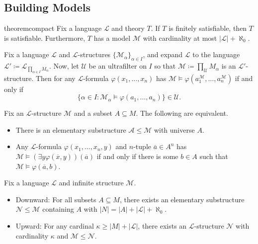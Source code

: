 \documentclass{article}
\begin{document}
\subsection{Building Models}
\begin{restatable}[compactness]{theorem}{compact} \label{thm:compactness}
	Fix a language $\mathcal L$ and theory $T$. If $T$ is finitely satisfiable, then $T$ is satisfiable. Furthermore, $T$ has a model $\mathcal M$ with cardinality at most $\left|\mathcal L\right|+\aleph_0$.
\end{restatable}
\begin{theorem}[\L{}o\'s] \label{thm:los}
	Fix a language $\mathcal L$ and $\mathcal L$-structures $\{\mathcal M_\alpha\}_{\alpha\in I}$, and expand $\mathcal L$ to the language $\mathcal L'\coloneqq\mathcal L_{\prod_{\alpha\in I}M_\alpha}$. Now, let $\mathcal U$ be an ultrafilter on $I$ so that $\mathcal M\coloneqq\prod_\mathcal UM_\alpha$ is an $\mathcal L'$-structure. Then for any $\mathcal L$-formula $\varphi(x_1,\ldots,x_n)$ has $\mathcal M\models\varphi\left(a_1^\mathcal M,\ldots,a_n^\mathcal M\right)$ if and only if
	\[\{\alpha\in I:\mathcal M_\alpha\models\varphi(a_1,\ldots,a_n)\}\in\mathcal U.\]
\end{theorem}
\begin{lemma} \label{lem:tarski-vaught}
	Fix an $\mathcal L$-structure $\mathcal M$ and a subset $A\subseteq M$. The following are equivalent.
	\begin{itemize}
		\item There is an elementary substructure $\mathcal A\le\mathcal M$ with universe $A$.
		\item Any $\mathcal L$-formula $\varphi(x_1,\ldots,x_n,y)$ and $n$-tuple $\overline a\in A^n$ has $\mathcal M\models(\exists y\varphi(\overline x,y))(\overline a)$ if and only if there is some $b\in A$ such that $\mathcal M\models\varphi(\overline a,b)$.
	\end{itemize}
\end{lemma}
\begin{theorem} \label{thm:down-skolem}
	Fix a language $\mathcal L$ and infinite structure $\mathcal M$.
	\begin{itemize}
		\item Downward: For all subsets $A\subseteq M$, there exists an elementary substructure $\mathcal N\le\mathcal M$ containing $A$ with $\left|N\right|=\left|A\right|+\left|\mathcal L\right|+\aleph_0$.
		\item Upward: For any cardinal $\kappa\ge\left|M\right|+\left|\mathcal L\right|$, there exists an $\mathcal L$-structure $\mathcal N$ with cardinality $\kappa$ and $\mathcal M\le\mathcal N$.
	\end{itemize}
\end{theorem}
\end{document}

